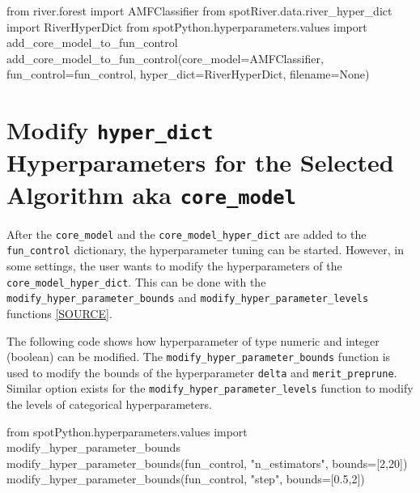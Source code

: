 \documentclass[
  letterpaper,
  DIV=11,
  numbers=noendperiod]{scrreprt}
\newenvironment{Shaded}{\begin{snugshade}}{\end{snugshade}}
\newcommand{\DecValTok}[1]{\textcolor[rgb]{0.68,0.00,0.00}{#1}}
\newcommand{\FloatTok}[1]{\textcolor[rgb]{0.68,0.00,0.00}{#1}}
\newcommand{\ImportTok}[1]{\textcolor[rgb]{0.00,0.46,0.62}{#1}}
\newcommand{\NormalTok}[1]{\textcolor[rgb]{0.00,0.23,0.31}{#1}}
\newcommand{\OperatorTok}[1]{\textcolor[rgb]{0.37,0.37,0.37}{#1}}
\newcommand{\StringTok}[1]{\textcolor[rgb]{0.13,0.47,0.30}{#1}}
\newcommand{\VariableTok}[1]{\textcolor[rgb]{0.07,0.07,0.07}{#1}}
\begin{document}
\begin{Shaded}
\begin{Highlighting}[]
\ImportTok{from}\NormalTok{ river.forest }\ImportTok{import}\NormalTok{ AMFClassifier}
\ImportTok{from}\NormalTok{ spotRiver.data.river\_hyper\_dict }\ImportTok{import}\NormalTok{ RiverHyperDict}
\ImportTok{from}\NormalTok{ spotPython.hyperparameters.values }\ImportTok{import}\NormalTok{ add\_core\_model\_to\_fun\_control}
\NormalTok{add\_core\_model\_to\_fun\_control(core\_model}\OperatorTok{=}\NormalTok{AMFClassifier,}
\NormalTok{                              fun\_control}\OperatorTok{=}\NormalTok{fun\_control,}
\NormalTok{                              hyper\_dict}\OperatorTok{=}\NormalTok{RiverHyperDict,}
\NormalTok{                              filename}\OperatorTok{=}\VariableTok{None}\NormalTok{)}
\end{Highlighting}
\end{Shaded}

\hypertarget{modify-hyper_dict-hyperparameters-for-the-selected-algorithm-aka-core_model-2}{%
\section{\texorpdfstring{Modify \texttt{hyper\_dict} Hyperparameters for
the Selected Algorithm aka
\texttt{core\_model}}{Modify hyper\_dict Hyperparameters for the Selected Algorithm aka core\_model}}\label{modify-hyper_dict-hyperparameters-for-the-selected-algorithm-aka-core_model-2}}

After the \texttt{core\_model} and the \texttt{core\_model\_hyper\_dict}
are added to the \texttt{fun\_control} dictionary, the hyperparameter
tuning can be started. However, in some settings, the user wants to
modify the hyperparameters of the \texttt{core\_model\_hyper\_dict}.
This can be done with the \texttt{modify\_hyper\_parameter\_bounds} and
\texttt{modify\_hyper\_parameter\_levels} functions
\href{https://github.com/sequential-parameter-optimization/spotPython/blob/main/src/spotPython/hyperparameters/values.py}{{[}SOURCE{]}}.

The following code shows how hyperparameter of type numeric and integer
(boolean) can be modified. The \texttt{modify\_hyper\_parameter\_bounds}
function is used to modify the bounds of the hyperparameter
\texttt{delta} and \texttt{merit\_preprune}. Similar option exists for
the \texttt{modify\_hyper\_parameter\_levels} function to modify the
levels of categorical hyperparameters.

\begin{Shaded}
\begin{Highlighting}[]
\ImportTok{from}\NormalTok{ spotPython.hyperparameters.values }\ImportTok{import}\NormalTok{ modify\_hyper\_parameter\_bounds}
\NormalTok{modify\_hyper\_parameter\_bounds(fun\_control, }\StringTok{"n\_estimators"}\NormalTok{, bounds}\OperatorTok{=}\NormalTok{[}\DecValTok{2}\NormalTok{,}\DecValTok{20}\NormalTok{])}
\NormalTok{modify\_hyper\_parameter\_bounds(fun\_control, }\StringTok{"step"}\NormalTok{, bounds}\OperatorTok{=}\NormalTok{[}\FloatTok{0.5}\NormalTok{,}\DecValTok{2}\NormalTok{])}
\end{Highlighting}
\end{Shaded}
\end{document}
